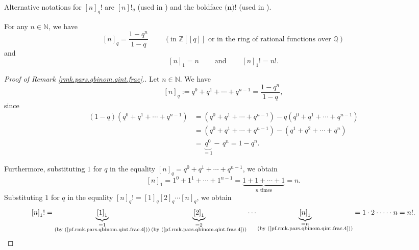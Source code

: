 Alternative notations for $\left[  n\right]  _{q}!$ are $\left[  n\right]
!_{q}$ (used in \cite{Loehr-BC}) and the boldface $\mathbf{(}\boldsymbol{n}%
\mathbf{)!}$ (used in \cite{Stanley-EC1}).

\begin{remark}
\label{rmk.pars.qbinom.qint.frac}For any $n\in\mathbb{N}$, we have%
\[
\left[  n\right]  _{q}=\dfrac{1-q^{n}}{1-q}\ \ \ \ \ \ \ \ \ \ \left(
\text{in }\mathbb{Z}\left[  \left[  q\right]  \right]  \text{ or in the ring
of rational functions over }\mathbb{Q}\right)
\]
and%
\[
\left[  n\right]  _{1}=n\ \ \ \ \ \ \ \ \ \ \text{and}%
\ \ \ \ \ \ \ \ \ \ \left[  n\right]  _{1}!=n!.
\]

\end{remark}

\begin{proof}
[Proof of Remark \ref{rmk.pars.qbinom.qint.frac}.]Let $n\in\mathbb{N}$. We
have%
\[
\left[  n\right]  _{q}:=q^{0}+q^{1}+\cdots+q^{n-1}=\dfrac{1-q^{n}}{1-q},
\]
since%
\begin{align*}
\left(  1-q\right)  \left(  q^{0}+q^{1}+\cdots+q^{n-1}\right)   &  =\left(
q^{0}+q^{1}+\cdots+q^{n-1}\right)  -q\left(  q^{0}+q^{1}+\cdots+q^{n-1}\right)
\\
&  =\left(  q^{0}+q^{1}+\cdots+q^{n-1}\right)  -\left(  q^{1}+q^{2}%
+\cdots+q^{n}\right) \\
&  =\underbrace{q^{0}}_{=1}-\,q^{n}=1-q^{n}.
\end{align*}


Furthermore, substituting $1$ for $q$ in the equality $\left[  n\right]
_{q}=q^{0}+q^{1}+\cdots+q^{n-1}$, we obtain%
\begin{equation}
\left[  n\right]  _{1}=1^{0}+1^{1}+\cdots+1^{n-1}=\underbrace{1+1+\cdots
+1}_{n\text{ times}}=n. \label{pf.rmk.pars.qbinom.qint.frac.4}%
\end{equation}
Substituting $1$ for $q$ in the equality $\left[  n\right]  _{q}!=\left[
1\right]  _{q}\left[  2\right]  _{q}\cdots\left[  n\right]  _{q}$, we obtain%
\[
\left[  n\right]  _{1}!=\underbrace{\left[  1\right]  _{1}}%
_{\substack{=1\\\text{(by (\ref{pf.rmk.pars.qbinom.qint.frac.4}))}%
}}\underbrace{\left[  2\right]  _{1}}_{\substack{=2\\\text{(by
(\ref{pf.rmk.pars.qbinom.qint.frac.4}))}}}\cdots\underbrace{\left[  n\right]
_{1}}_{\substack{=n\\\text{(by (\ref{pf.rmk.pars.qbinom.qint.frac.4}))}%
}}=1\cdot2\cdot\cdots\cdot n=n!.
\]

\end{proof}

